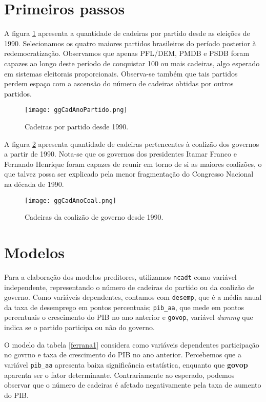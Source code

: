 \documentclass[
	article,			%
	11pt,				%
	oneside,			%
	a4paper,			%
	english,			%
	brazil,				%
	sumario=tradicional
	]{abntex2}
\begin{document}
\section*{Primeiros passos}

A figura \ref{fig:cadeiras-partido}  apresenta a quantidade de cadeiras por partido desde as eleições de 1990. Selecionamos os quatro maiores partidos brasileiros do período posterior à redemocratização. Observamos que apenas PFL/DEM, PMDB e PSDB foram capazes ao longo deste período de conquistar 100 ou mais cadeiras, algo esperado em sistemas eleitorais proporcionais. Observa-se também que tais partidos perdem espaço com a ascensão do número de cadeiras obtidas por outros partidos. 


\begin{figure}
	\centering
	\texttt{[image: ggCadAnoPartido.png]}
	\caption{Cadeiras por partido desde 1990.}
	\label{fig:cadeiras-partido}
\end{figure}

A figura \ref{fig:cadeiras-coal} apresenta quantidade de cadeiras pertencentes à coalizão dos governos a partir de 1990. Nota-se que os governos dos presidentes Itamar Franco e Fernando Henrique foram capazes de reunir em torno de si as maiores coalizões, o que talvez possa ser explicado pela menor fragmentação do Congresso Nacional na década de 1990.

\begin{figure}
	\centering
	\texttt{[image: ggCadAnoCoal.png]}
	\caption{Cadeiras da coalizão de governo desde 1990.}
	\label{fig:cadeiras-coal}
\end{figure}

\section*{Modelos}

Para a elaboração dos modelos preditores, utilizamos \texttt{ncadt} como variável independente, representando o número de cadeiras do partido ou da coalizão de governo. Como variáveis dependentes, contamos com \texttt{desemp}, que é a média anual da taxa de desemprego em pontos percentuais; \texttt{pib\_aa}, que mede em pontos percentuais o crescimento do PIB no ano anterior e \texttt{govop}, variável \textit{dummy} que indica se o partido participa ou não do governo.

O modelo da tabela \ref{ferrana1} considera como variáveis dependentes participação no govrno e taxa de crescimento do PIB no ano anterior. Percebemos que a variável \texttt{pib\_aa} apresenta baixa significância estatística, enquanto que \textbf{govop} aparenta ser o fator determinante. Contrariamente ao esperado, podemos observar que o número de cadeiras é afetado negativamente pela taxa de aumento do PIB.
\end{document}
